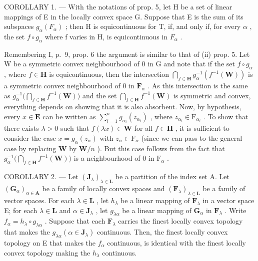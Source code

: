 COROLLARY 1. --- With the notations of prop. 5, let H be a set of linear mappings of E in the locally convex space G. Suppose that E is the sum of its subspaces \(g_{\alpha}(F_{\alpha})\) ; then H is equicontinuous for T, if, and only if, for every \(\alpha\) , the set \(f \circ g_{\alpha}\) where f varies in H, is equicontinuous in \(F_{\alpha}\) .

Remembering I, p.~9, prop. 6 the argument is similar to that of (ii) prop. 5. Let W be a symmetric convex neighbourhood of 0 in G and note that if the set \(f \circ g_{\alpha}\) , where \(f \in \mathbf{H}\) is equicontinuous, then the intersection \(\bigcap_{f \in \mathbf{H}} g_{\alpha}^{-1}(f^{-1}(\mathbf{W}))\) is a symmetric convex neighbourhood of 0 in \(\mathbf{F}_{\alpha}\) . As this intersection is the same as \(g_{\alpha}^{-1}\big(\bigcap_{f \in \mathbf{H}} f^{-1}(\mathbf{W})\big)\) and the set \(\bigcap_{f \in \mathbf{H}} f^{-1}(\mathbf{W})\) is symmetric and convex, everything depends on showing that it is also absorbent. Now, by hypothesis, every \(x \in \mathbf{E}\) can be written as \(\sum_{i=1}^{n} g_{\alpha_i}(z_{\alpha_i})\) , where \(z_{\alpha_i} \in \mathrm{F}_{\alpha_i}\) . To show that there exists \(\lambda > 0\) such that \(f(\lambda x) \in \mathbf{W}\) for all \(f \in \mathbf{H}\) , it is sufficient to consider the case \(x = g_{\alpha}(z_{\alpha})\) with \(z_{\alpha} \in \mathrm{F}_{\alpha}\) (since we can pass to the general case by replacing \(\mathbf{W}\) by \(\mathbf{W}/n\) ). But this case follows from the fact that \(g_{\alpha}^{-1}\big(\bigcap_{f \in \mathbf{H}} f^{-1}(\mathbf{W})\big)\) is a neighbourhood of 0 in \(\mathrm{F}_{\alpha}\) .

COROLLARY 2. --- Let \((\mathbf{J}_{\lambda})_{\lambda \in \mathbf{L}}\) be a partition of the index set A. Let \((\mathbf{G}_{\alpha})_{\alpha \in \mathbf{A}}\) be a family of locally convex spaces and \((\mathbf{F}_{\lambda})_{\lambda \in \mathbf{L}}\) be a family of vector spaces. For each \(\lambda \in \mathbf{L}\) , let \(h_{\lambda}\) be a linear mapping of \(\mathbf{F}_{\lambda}\) in a vector space E; for each \(\lambda \in \mathbf{L}\) and \(\alpha \in \mathbf{J}_{\lambda}\) , let \(g_{\lambda \alpha}\) be a linear mapping of \(\mathbf{G}_{\alpha}\) in \(\mathbf{F}_{\lambda}\) . Write \(f_{\alpha} = h_{\lambda} \circ g_{\lambda \alpha}\) . Suppose that each \(\mathbf{F}_{\lambda}\) carries the finest locally convex topology that makes the \(g_{\lambda \alpha} (\alpha \in \mathbf{J}_{\lambda})\) continuous. Then, the finest locally convex topology on E that makes the \(f_{\alpha}\) continuous, is identical with the finest locally convex topology making the \(h_{\lambda}\) continuous.


